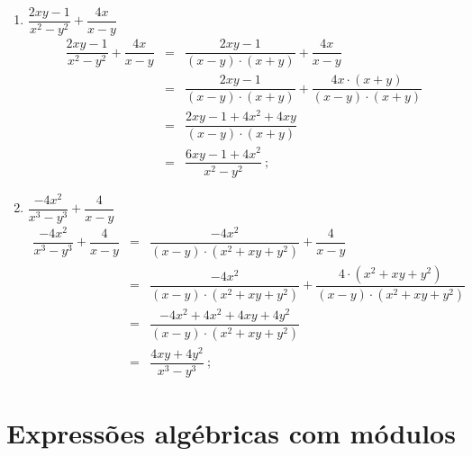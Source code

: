 \begin{exem}
\begin{enumerate}
  
  \item $\dfrac{2xy-1}{x^2 - y^2} + \dfrac{4x}{x-y}$
  \begin{eqnarray*}
   \dfrac{2xy-1}{x^2 - y^2} + \dfrac{4x}{x-y} &=& \dfrac{2xy-1}{(x-y)\cdot (x+y)} + \dfrac{4x}{x-y} \\
   &=& \dfrac{2xy-1}{(x-y)\cdot (x+y)} + \dfrac{4x \cdot (x+y)}{(x-y)\cdot (x+y)} \\
   &=& \dfrac{2xy - 1 + 4x^2 + 4xy}{(x-y)\cdot (x+y)} \\
   &=& \dfrac{6xy - 1 + 4x^2}{x^2 - y^2} \ ;
  \end{eqnarray*}
  
  \item $\dfrac{-4x^2}{x^3 - y^3} + \dfrac{4}{x-y}$
  \begin{eqnarray*}
   \dfrac{-4x^2}{x^3 - y^3} + \dfrac{4}{x-y} & = & \dfrac{-4x^2}{(x-y)\cdot (x^2+xy+y^2)} + \dfrac{4}{x-y} \\
   &=& \dfrac{-4x^2}{(x-y)\cdot (x^2+xy+y^2)} + \dfrac{4 \cdot (x^2+xy+y^2)}{(x-y)\cdot (x^2+xy+y^2)} \\
   &=& \dfrac{-4x^2 + 4x^2 + 4xy + 4y^2}{(x-y) \cdot (x^2+xy+y^2)} \\
   &=& \dfrac{4xy + 4y^2}{x^3 - y^3}  \ ;
  \end{eqnarray*}
  
 \end{enumerate}
 
 \end{exem}

 
 \section{Expressões algébricas com módulos}
 
